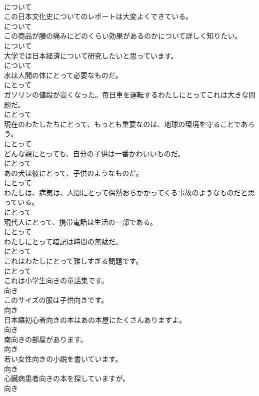 \documentclass[8pt]{extreport}
\begin{document}
\begin{CJK}{UTF8}{min}
\\	について
\\	この日本文化史についてのレポートは大変よくできている。	
\\	について
\\	この商品が腰の痛みにどのくらい効果があるのかについて詳しく知りたい。	
\\	について
\\	大学では日本経済について研究したいと思っています。	
\\	について
\\	水は人間の体にとって必要なものだ。	
\\	にとって
\\	ガソリンの値段が高くなった。毎日車を運転するわたしにとってこれは大きな問題だ。	
\\	にとって
\\	現在のわたしたちにとって、もっとも重要なのは、地球の環境を守ることであろう。	
\\	にとって
\\	どんな親にとっても、自分の子供は一番かわいいものだ。	
\\	にとって
\\	あの犬は彼にとって、子供のようなものだ。	
\\	にとって
\\	わたしは、病気は、人間にとって偶然おちかかってくる事故のようなものだと思っている。	
\\	にとって
\\	現代人にとって、携帯電話は生活の一部である。	
\\	にとって
\\	わたしにとって暗記は時間の無駄だ。	
\\	にとって
\\	これはわたしにとって難しすぎる問題です。	
\\	にとって
\\	これは小学生向きの童話集です。	
\\	向き
\\	このサイズの服は子供向きです。	
\\	向き
\\	日本語初心者向きの本はあの本屋にたくさんありますよ。	
\\	向き
\\	南向きの部屋があります。	
\\	向き
\\	若い女性向きの小説を書いています。	
\\	向き
\\	心臓病患者向きの本を探していますが。	
\\	向き

\end{CJK}
\end{document}
